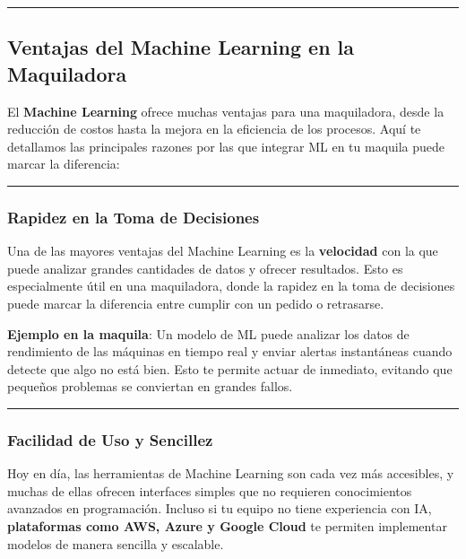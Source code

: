 \documentclass[
  10pt,
  letterpaper,
]{book}
\begin{document}
\begin{center}\rule{0.5\linewidth}{0.5pt}\end{center}

\subsection{Ventajas del Machine Learning en la
Maquiladora}\label{ventajas-del-machine-learning-en-la-maquiladora}

El \textbf{Machine Learning} ofrece muchas ventajas para una
maquiladora, desde la reducción de costos hasta la mejora en la
eficiencia de los procesos. Aquí te detallamos las principales razones
por las que integrar ML en tu maquila puede marcar la diferencia:

\begin{center}\rule{0.5\linewidth}{0.5pt}\end{center}

\subsubsection{\texorpdfstring{\textbf{Rapidez en la Toma de
Decisiones}}{Rapidez en la Toma de Decisiones}}\label{rapidez-en-la-toma-de-decisiones}

Una de las mayores ventajas del Machine Learning es la
\textbf{velocidad} con la que puede analizar grandes cantidades de datos
y ofrecer resultados. Esto es especialmente útil en una maquiladora,
donde la rapidez en la toma de decisiones puede marcar la diferencia
entre cumplir con un pedido o retrasarse.

\textbf{Ejemplo en la maquila}: Un modelo de ML puede analizar los datos
de rendimiento de las máquinas en tiempo real y enviar alertas
instantáneas cuando detecte que algo no está bien. Esto te permite
actuar de inmediato, evitando que pequeños problemas se conviertan en
grandes fallos.

\begin{center}\rule{0.5\linewidth}{0.5pt}\end{center}

\subsubsection{\texorpdfstring{\textbf{Facilidad de Uso y
Sencillez}}{Facilidad de Uso y Sencillez}}\label{facilidad-de-uso-y-sencillez}

Hoy en día, las herramientas de Machine Learning son cada vez más
accesibles, y muchas de ellas ofrecen interfaces simples que no
requieren conocimientos avanzados en programación. Incluso si tu equipo
no tiene experiencia con IA, \textbf{plataformas como AWS, Azure y
Google Cloud} te permiten implementar modelos de manera sencilla y
escalable.
\end{document}
